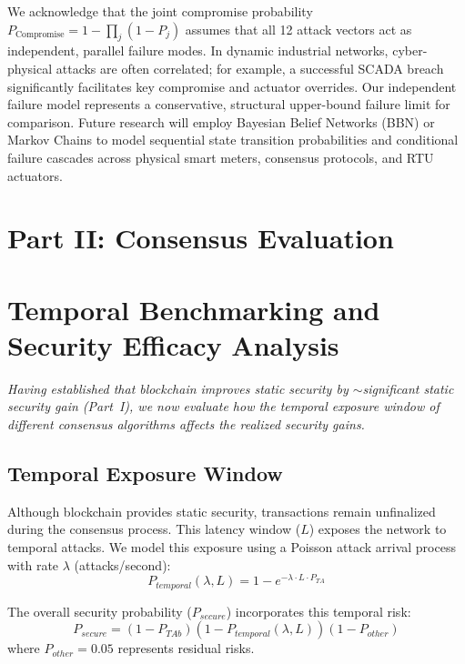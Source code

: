 \documentclass[10pt,twocolumn,journal]{IEEEtran}
\begin{document}
We acknowledge that the joint compromise probability $P_{\mathrm{Compromise}} = 1 - \prod_{j} (1 - P_j)$ assumes that all 12 attack vectors act as independent, parallel failure modes. In dynamic industrial networks, cyber-physical attacks are often correlated; for example, a successful SCADA breach significantly facilitates key compromise and actuator overrides. Our independent failure model represents a conservative, structural upper-bound failure limit for comparison. Future research will employ Bayesian Belief Networks (BBN) or Markov Chains to model sequential state transition probabilities and conditional failure cascades across physical smart meters, consensus protocols, and RTU actuators.

\section*{Part II: Consensus Evaluation}
\section{Temporal Benchmarking and Security Efficacy Analysis}
\label{sec:temporal_benchmarking}
\label{sec:stsf}

\emph{Having established that blockchain improves static security by $\sim$significant static security gain (Part~I), we now evaluate how the temporal exposure window of different consensus algorithms affects the realized security gains.}

\subsection{Temporal Exposure Window}

Although blockchain provides static security, transactions remain unfinalized during the consensus process. This latency window ($L$) exposes the network to temporal attacks. We model this exposure using a Poisson attack arrival process with rate $\lambda$ (attacks/second):
\begin{equation}
P_{temporal}(\lambda, L) = 1 - e^{-\lambda \cdot L \cdot P_{TA}}
\end{equation}

The overall security probability ($P_{secure}$) incorporates this temporal risk:
\begin{equation}
P_{secure} = (1 - P_{TAb})(1 - P_{temporal}(\lambda, L))(1 - P_{other})
\end{equation}
where $P_{other} = 0.05$ represents residual risks.
\end{document}
